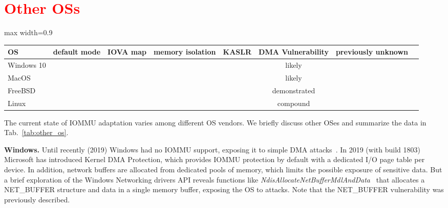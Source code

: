 
\section{\textcolor{red}{Other OSs}}\label{sec:other_os}

\begin{table*}[t]
\begin{adjustbox}{max width=0.9\textwidth}
\begin{tabular}{l|ccccccc}
OS                           & default mode & IOVA map   & memory isolation    & KASLR &  DMA Vulnerability & previously unknown          \\ \hline

Windows 10  & \V   & \V & \X & \V   & likely        &    \\
MacOS       & \V   & \X & \X & \V   & likely        &    \\
FreeBSD     & \X   & \V & \X & \V   & demonstrated  &    \\
Linux       & \V   & \V & \X & \V   & compound      & \V \\\hline       
\end{tabular}
\end{adjustbox}
  \caption{IOMMU adaptation in different OS's.}
  \label{tab:other_os}
\end{table*}

The current state of IOMMU adaptation varies among different OS vendors. We briefly discuss other OSes and summarize the data in Tab.~\ref{tab:other_os}. 

\smallskip
\noindent\textbf{Windows.} Until recently (2019) Windows had no IOMMU support, exposing it to simple DMA attacks~\cite{thunder}.
In 2019 (with build 1803) Microsoft has introduced Kernel DMA Protection\cite{ms_iommu}, which provides IOMMU protection by default with a dedicated I/O page table per device. 
In addition, network buffers are allocated from dedicated pools of memory, which limits the possible exposure of sensitive data. But a brief exploration of the Windows Networking drivers API reveals functions like \emph{NdisAllocateNetBufferMdlAndData}~\cite{ms_single} that allocates a NET\_BUFFER structure and data in a single memory buffer, exposing the OS to \simple attacks. Note that the NET\_BUFFER vulnerability was previously described\cite{thunder}. 

